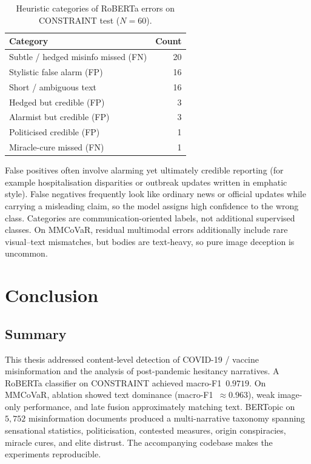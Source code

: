 \documentclass[12pt, a4paper]{report}
\begin{document}
\begin{table}[htbp]
\centering
\caption{Heuristic categories of RoBERTa errors on CONSTRAINT test ($N=60$).}
\label{tab:error-cats}
\begin{tabular}{lr}
\hline
Category & Count \\
\hline
Subtle / hedged misinfo missed (FN) & 20 \\
Stylistic false alarm (FP) & 16 \\
Short / ambiguous text & 16 \\
Hedged but credible (FP) & 3 \\
Alarmist but credible (FP) & 3 \\
Politicised credible (FP) & 1 \\
Miracle-cure missed (FN) & 1 \\
\hline
\end{tabular}
\end{table}

False positives often involve alarming yet ultimately credible reporting (for example hospitalisation disparities or outbreak updates written in emphatic style).
False negatives frequently look like ordinary news or official updates while carrying a misleading claim, so the model assigns high confidence to the wrong class.
Categories are communication-oriented labels, not additional supervised classes.
On MMCoVaR, residual multimodal errors additionally include rare visual--text mismatches, but bodies are text-heavy, so pure image deception is uncommon.


\chapter{Conclusion}
\label{chap:conclusion}

\section{Summary}
\label{sec:summary}

This thesis addressed content-level detection of COVID-19 / vaccine misinformation and the analysis of post-pandemic hesitancy narratives.
A RoBERTa classifier on CONSTRAINT achieved macro-F1~$0.9719$.
On MMCoVaR, ablation showed text dominance (macro-F1~$\approx 0.963$), weak image-only performance, and late fusion approximately matching text.
BERTopic on $5{,}752$ misinformation documents produced a multi-narrative taxonomy spanning sensational statistics, politicisation, contested measures, origin conspiracies, miracle cures, and elite distrust.
The accompanying codebase makes the experiments reproducible.
\end{document}
